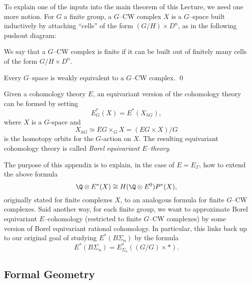 To explain one of the inputs into the main theorem of this Lecture, we need one more notion. For $G$ a finite group, a $G$--CW complex $X$ is a $G$--space built inductively by attaching ``cells'' of the form $(G/H) \times D^n$, as in the following pushout diagram:
\begin{center}
\end{center}
We say that a $G$--CW complex is finite if it can be built out of finitely many cells of the form $G/H \times D^n$.

\begin{theorem} \label{app:CWapprox}
Every $G$--space is weakly equivalent to a $G$--CW complex. \qed
\end{theorem}

Given a cohomology theory $E$, an equivariant version of the cohomology theory can be formed by setting
\[
E^{*}_{G}(X) = E^*(X_{hG}),
\]
where $X$ is a $G$-space and
\[
X_{hG} \simeq EG \times_G X = (EG \times X)/G
\]
is the homotopy orbits for the $G$-action on $X$. The resulting equivariant cohomology theory is called \textit{Borel equivariant $E$--theory}.

The purpose of this appendix is to explain, in the case of $E = E_{\Gamma}$, how to extend the above formula \[\Q \otimes E^*(X) \cong H(\Q \otimes E^0)P^*(X),\] originally stated for finite complexes $X$, to an analogous formula for finite $G$--CW complexes. Said another way, for each finite group, we want to approximate Borel equivariant $E$--cohomology (restricted to finite $G$--CW complexes) by some version of Borel equivariant rational cohomology.  In particular, this links back up to our original goal of studying $E^*(B\Sigma_n)$ by the formula \[E^*(B\Sigma_n) = E_{\Sigma_n}^*((G/G) \times *).\]

\subsection*{Formal Geometry}


